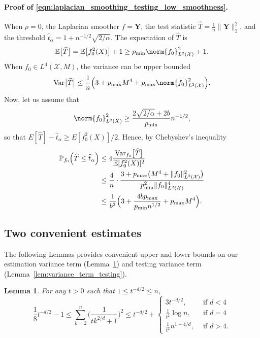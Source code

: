 \documentclass[twoside]{article}
\newcommand{\Var}{\mathrm{Var}}
\newcommand{\1}{\mathbf{1}}
\newcommand{\Xset}{\mathcal{X}}
\newcommand{\Leb}{L}
\newcommand{\Ebb}{\mathbb{E}}
\newcommand{\wh}[1]{\widehat{#1}}
\newtheorem{lemma}{Lemma}
\theoremstyle{definition}
\theoremstyle{remark}
\begin{document}
\paragraph{Proof of \eqref{eqn:laplacian_smoothing_testing_low_smoothness}.}
When $\rho = 0$, the Laplacian smoother $\wh{f} = \mathbf{Y}$, the test statistic $\wh{T} = \frac{1}{n}\|\mathbf{Y}\|_2^2$, and the threshold $\wh{t}_{\alpha} = 1 + n^{-1/2}\sqrt{2/\alpha}$. The expectation of $\wh{T}$ is 
\begin{equation*}
\Ebb\bigl[\wh{T}\bigr] = \mathbb{E}\bigl[f_0^2(X)\bigr] + 1 \geq p_{\min} \norm{f_0}_{\Leb^2(\Xset)}^2 + 1.
\end{equation*}
When $f_0 \in \Leb^4(\Xset,M)$, the variance can be upper bounded
\begin{equation*}
\Var\bigl[\wh{T}\bigr] \leq \frac{1}{n}\Bigl(3 + p_{\max} M^4 + p_{\max}\norm{f_0}_{\Leb^2(\Xset)}^2\Bigr).
\end{equation*}
Now, let us assume that
\begin{equation*}
\norm{f_0}_{\Leb^2(X)}^2 \geq \frac{2\sqrt{2/\alpha} + 2b}{p_{\min}} n^{-1/2},
\end{equation*}
so that $E[\wh{T}] - \wh{t}_{\alpha} \geq E[f_0^2(X)]/2$. Hence, by Chebyshev's inequality
\begin{align*}
\mathbb{P}_{f_0}\Bigl(\wh{T} \leq \wh{t}_{\alpha} \Bigr) & \leq 4 \frac{\Var_{f_0}\bigl[\wh{T}\bigr]}{\mathbb{E}[f_0^2(X)]^2} \\
& \leq \frac{4}{n} \cdot \frac{ 3 + p_{\max}\bigl(M^4 + \|f_0\|_{\Leb^2(\Xset)}^2 \bigr)}{p_{\min}^2 \|f_0\|_{\Leb^2(\Xset)}^4} \\
& \leq \frac{1}{b^2}\Bigl(3 + \frac{4bp_{\max}}{p_{\min}n^{1/2}} + p_{\max}M^4\Bigr).
\end{align*}

\subsection{Two convenient estimates}
\label{subsec:convenient_estimate}

The following Lemmas provides convenient upper and lower bounds on our estimation variance term (Lemma~\ref{lem:variance_term_estimation}) and testing variance term (Lemma~\ref{lem:variance_term_testing}).
\begin{lemma}
	\label{lem:variance_term_estimation}
	For any $t > 0$ such that $1 \leq t^{-d/2} \leq n$,
	\begin{equation*}
	\frac{1}{8}t^{-d/2} - 1 \leq \sum_{k = 2}^{n} \biggl(\frac{1}{tk^{2/d} + 1}\biggr)^2 \leq t^{-d/2} +
	\begin{cases*}
	3t^{-d/2},& ~~\textrm{if $d < 4$} \\
	\frac{1}{t^2}\log n,& ~~\textrm{if $d = 4$} \\
	\frac{1}{t^2}n^{1 - 4/d},&~~\textrm{if $d > 4$.}
	\end{cases*}
	\end{equation*}
\end{lemma}
\end{document}
